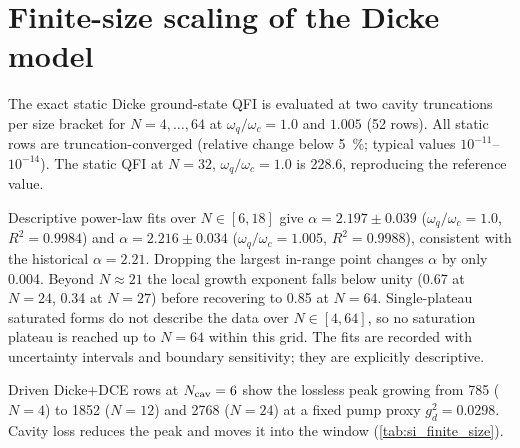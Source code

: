 \documentclass[aps,prxquantum,preprint,superscriptaddress,amsmath,amssymb]{revtex4-2}
\begin{document}
\section{Finite-size scaling of the Dicke model}
\label{sec:si_finite_size}

The exact static Dicke ground-state QFI is evaluated at two cavity truncations per size bracket for $N=\num{4},\dots,\num{64}$ at $\omega_q/\omega_c=\num{1.0}$ and $\num{1.005}$ (\num{52} rows). All static rows are truncation-converged (relative change below \qty{5}{\percent}; typical values $10^{-11}$--$10^{-14}$). The static QFI at $N=\num{32}$, $\omega_q/\omega_c=\num{1.0}$ is \num{228.6}, reproducing the reference value.

Descriptive power-law fits over $N\in[\num{6},\num{18}]$ give $\alpha=\num{2.197}\pm\num{0.039}$ ($\omega_q/\omega_c=\num{1.0}$, $R^2=\num{0.9984}$) and $\alpha=\num{2.216}\pm\num{0.034}$ ($\omega_q/\omega_c=\num{1.005}$, $R^2=\num{0.9988}$), consistent with the historical $\alpha=\num{2.21}$. Dropping the largest in-range point changes $\alpha$ by only \num{0.004}. Beyond $N\approx\num{21}$ the local growth exponent falls below unity (\num{0.67} at $N=\num{24}$, \num{0.34} at $N=\num{27}$) before recovering to \num{0.85} at $N=\num{64}$. Single-plateau saturated forms do not describe the data over $N\in[\num{4},\num{64}]$, so no saturation plateau is reached up to $N=\num{64}$ within this grid. The fits are recorded with uncertainty intervals and boundary sensitivity; they are explicitly descriptive.

Driven Dicke+DCE rows at $N_{\rm cav}=\num{6}$ show the lossless peak growing from \num{785} ($N=\num{4}$) to \num{1852} ($N=\num{12}$) and \num{2768} ($N=\num{24}$) at a fixed pump proxy $g_d^2=\num{0.0298}$. Cavity loss reduces the peak and moves it into the window (\cref{tab:si_finite_size}).
\end{document}
